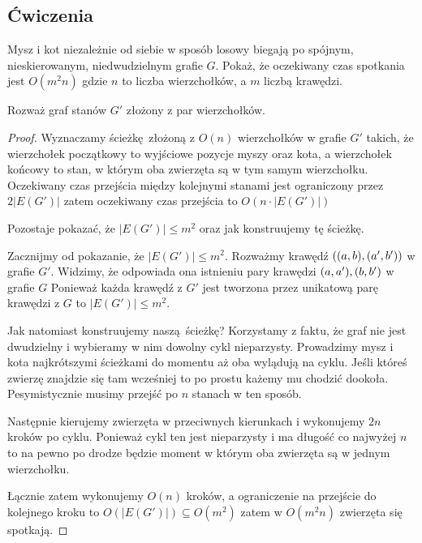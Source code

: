 \subsection{Ćwiczenia}

\begin{exercise}
	Mysz i kot niezależnie od siebie w sposób losowy biegają po spójnym, nieskierowanym, niedwudzielnym grafie \(G\).
	Pokaż, że oczekiwany czas spotkania jest \(O(m^2n)\) gdzie \(n\) to liczba wierzchołków, a \(m\) liczbą krawędzi.

	Rozważ graf stanów \(G'\) złożony z par wierzchołków.
\end{exercise}

\begin{proof}
	Wyznaczamy ścieżkę złożoną z \( O(n) \) wierzchołków w grafie \(G'\) takich, że wierzchołek początkowy
	to wyjściowe pozycje myszy oraz kota, a wierzchołek końcowy to stan, w którym oba zwierzęta są w tym samym wierzchołku.
	Oczekiwany czas przejścia między kolejnymi stanami jest ograniczony przez \( 2|E(G')| \)
	zatem oczekiwany czas przejścia to \( O(n \cdot |E(G')|) \)

	Pozostaje pokazać, że \( |E(G')| \leq m^2 \) oraz jak konstruujemy tę ścieżkę.

	Zacznijmy od pokazanie, że \( |E(G')| \leq m^2 \).
	Rozważmy krawędź \( \pars{ \pars{a, b}, \pars{a', b'}} \) w grafie \( G' \).
	Widzimy, że odpowiada ona istnieniu pary krawędzi \( \pars{a, a'}, \pars{b, b'} \) w grafie \( G \)
	Ponieważ każda krawędź z \( G' \) jest tworzona przez unikatową parę krawędzi z \( G \)
	to \( |E(G')| \leq m^2 \).

	Jak natomiast konstruujemy naszą ścieżkę?
	Korzystamy z faktu, że graf nie jest dwudzielny i wybieramy w nim dowolny cykl nieparzysty.
	Prowadzimy mysz i kota najkrótszymi ścieżkami do momentu aż oba wylądują na cyklu. Jeśli któreś zwierzę
	znajdzie się tam wcześniej to po prostu każemy mu chodzić dookoła. Pesymistycznie musimy przejść po
	\( n \) stanach w ten sposób.

	Następnie kierujemy zwierzęta w przeciwnych kierunkach i wykonujemy \( 2n \) kroków po cyklu.
	Ponieważ cykl ten jest nieparzysty i ma długość co najwyżej \( n \) to na pewno po drodze będzie moment
	w którym oba zwierzęta są w jednym wierzchołku.

	Łącznie zatem wykonujemy \( O(n) \) kroków, a ograniczenie na przejście do kolejnego kroku to \( O(|E(G')|) \subseteq O(m^2) \) zatem w \( O(m^2n) \) zwierzęta się spotkają.



\end{proof}

